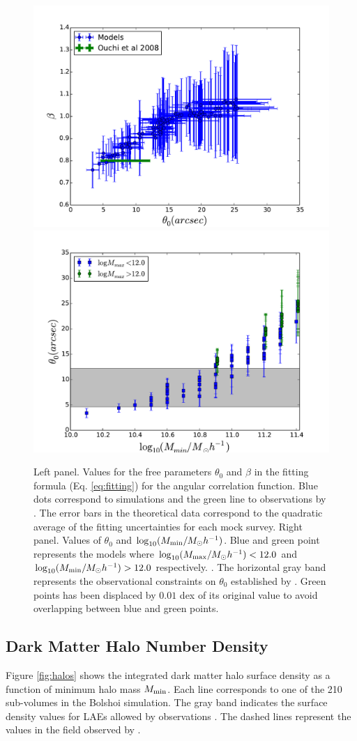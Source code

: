 \documentclass{emulateapj}
\begin{document}
\begin{figure}
\begin{center}
\includegraphics[width=0.49\linewidth,angle=0]{Fig7_corr_params.pdf}  
\includegraphics[width=0.49\linewidth,angle=0]{Fig7_mmin_vs_theta.pdf} 
\end{center}
\caption{Left panel. Values for the free parameters $\theta_{0}$ and $\beta$
in the fitting formula (Eq. \ref{eq:fitting}) for the angular
correlation function. Blue dots correspond to simulations and the
green line to observations by \citet{Ouchi2008,Ouchi2010}. The error
bars in the theoretical data correspond to the quadratic average of
the fitting uncertainties for each mock survey. Right panel. Values of
$\theta_{0}$  and $\log_{10}(M_{\rm min}/M_{\odot} h^{-1})$. Blue and
green point represents the models where  $\log_{10}(M_{\rm max}/M_{\odot}
h^{-1})<12.0$ and  $\log_{10}(M_{\rm min}/M_{\odot} h^{-1})>12.0$
respectively. .  The horizontal gray band represents the observational
constraints on $\theta_{0}$ established by
\citet{Ouchi2008,Ouchi2010}. Green points has been displaced by
$0.01$ dex of its original value to avoid overlapping between blue and
green points.} \label{fig:correlation_parameters}   
\end{figure}


\subsection{Dark Matter Halo Number Density}

Figure \ref{fig:halos} shows the  integrated dark matter halo surface
density as a function of  minimum halo mass $M_{\rm min}$. Each line
corresponds to one of the 210 sub-volumes in the Bolshoi
simulation. The gray band indicates the surface density values for
LAEs allowed by observations \citep{Yamada2012}. The dashed lines
represent the values in the field observed by
\citep{Ouchi2008}. 
\end{document}
